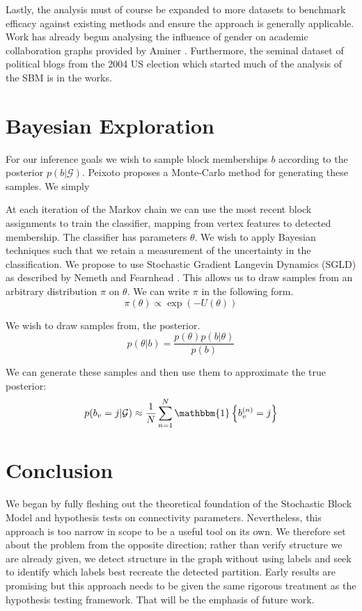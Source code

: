 \documentclass[11pt]{article}
\newcommand{\Gcal}{\mathcal{G}}
\newcommand{\one}{\mathbbm{1}}
\begin{document}
\begin{multicols*}{2}
Lastly, the analysis must of course be expanded to more datasets to benchmark efficacy against existing methods and ensure the approach is generally applicable. Work has already begun analysing the influence of gender on academic collaboration graphs provided by Aminer \cite{aminer}. Furthermore, the seminal dataset of political blogs from the 2004 US election \cite{polblogs} which started much of the analysis of the SBM is in the works.

\section{Bayesian Exploration}

For our inference goals we wish to sample block memberships $b$ according to the posterior $p(b | \Gcal)$. Peixoto \cite{Peixoto-MCMC} proposes a Monte-Carlo method for generating these samples. We simply

At each iteration of the Markov chain we can use the most recent block assignments to train the classifier, mapping from vertex features to detected membership. The classifier has parameters $\theta$. We wish to apply Bayesian techniques such that we retain a measurement of the uncertainty in the classification. We propose to use Stochastic Gradient Langevin Dynamics (SGLD) as described by Nemeth and Fearnhead \cite{Nemeth-SGMCMC}. This allows us to draw samples from an arbitrary distribution $\pi$ on $\theta$. We can write $\pi$ in the following form.
%
\begin{equation}
	\pi(\theta) \propto \exp \left( - U(\theta) \right)
\end{equation}

We wish to draw samples from, the posterior.
%
\begin{equation}
	p(\theta | b) = \frac{p(\theta) p(b | \theta)}{p(b)}
\end{equation}

We can generate these samples and then use them to approximate the true posterior:
%
\begin{equation}
	p(b_v = j | \Gcal) \approx \frac{1}{N} \sum_{n=1}^{N} \one \left\{ b_v^{(n)} = j \right\}
\end{equation}

\section{Conclusion}

We began by fully fleshing out the theoretical foundation of the Stochastic Block Model and hypothesis tests on connectivity parameters. Nevertheless, this approach is too narrow in scope to be a useful tool on its own. We therefore set about the problem from the opposite direction; rather than verify structure we are already given, we detect structure in the graph without using labels and seek to identify which labels best recreate the detected partition. Early results are promising but this approach needs to be given the same rigorous treatment as the hypothesis testing framework. That will be the emphasis of future work.

\printbibliography

\end{multicols*}
\end{document}
